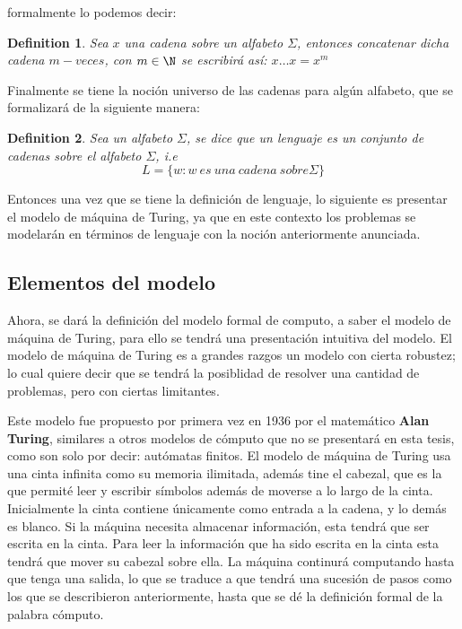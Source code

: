 \documentclass[10pt]{report}
\newtheorem{definition}{Definition}
\begin{document}
    formalmente lo podemos decir:\newline
    \begin{definition}
        Sea $x$ una cadena sobre un alfabeto $\Sigma$, entonces concatenar dicha cadena
        $m-veces$, con $m\in\N$ se escribirá así:\newline
        $x\dots x = x^m$
    \end{definition}
    Finalmente se tiene la noción universo de las cadenas para algún alfabeto, que se formalizará de la
    siguiente manera:
    \begin{definition}
        Sea un alfabeto $\Sigma$, se dice que un lenguaje es un conjunto de cadenas sobre el alfabeto $\Sigma$, i.e
        \begin{equation}
            \label{eq:equation7}
             L = \{w : w\ es \ una \ cadena\ sobre \Sigma \}
        \end{equation}
    \end{definition}
    Entonces una vez que se tiene la definición de lenguaje, lo siguiente es presentar el modelo de máquina de Turing,
    ya que en este contexto los problemas se modelarán en términos de lenguaje con la noción anteriormente anunciada.
    \newline

    \subsection{Elementos del modelo}\label{subsec:elementos-del-modelo-de-máquina-de-turing}
    Ahora, se dará la definición del modelo formal de computo, a saber el modelo de máquina de Turing,
    para ello se tendrá una presentación intuitiva del modelo.\newline
    El modelo de máquina de Turing es a grandes razgos un modelo con cierta robustez; lo cual quiere decir que se tendrá la posiblidad
    de resolver una cantidad de problemas, pero con ciertas limitantes.
    \newline

    Este modelo fue propuesto por primera vez en 1936 por el matemático \textbf{Alan Turing}, similares a
    otros modelos de cómputo que no se presentará en esta tesis, como son solo por decir: autómatas finitos.
    El modelo de máquina de Turing usa una cinta infinita como su memoria ilimitada,
    además tine el cabezal, que es la que permité leer y escribir símbolos además de moverse
    a lo largo de la cinta.
    \newline
    Inicialmente la cinta contiene únicamente como entrada a la cadena, y lo demás es blanco.
    Si la máquina necesita almacenar información, esta tendrá que ser escrita en la cinta.\newline
    Para leer la información que ha sido escrita en la cinta esta tendrá que mover su cabezal sobre ella.\space
    La máquina continurá computando hasta que tenga una salida, lo que se traduce a que tendrá una sucesión de pasos
    como los que se describieron anteriormente, hasta que se dé la definición formal de la palabra cómputo.
    \newline
\end{document}
